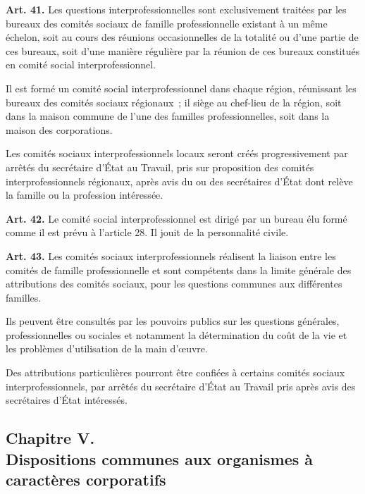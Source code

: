 \documentclass[french,twoside]{book} %
\newcommand{\labelchar}[1]{\textbf{\color{rubric} #1}}
\begin{document}
\noindent \labelchar{Art. 41.} Les questions interprofessionnelles sont exclusivement traitées par les bureaux des comités sociaux de famille professionnelle existant à un même échelon, soit au cours des réunions occasionnelles de la totalité ou d’une partie de ces bureaux, soit d’une manière régulière par la réunion de ces bureaux constitués en comité social interprofessionnel.\par
Il est formé un comité social interprofessionnel dans chaque région, réunissant les bureaux des comités sociaux régionaux ; il siège au chef-lieu de la région, soit dans la maison commune de l’une des familles professionnelles, soit dans la maison des corporations.\par
Les comités sociaux interprofessionnels locaux seront créés progressivement par arrêtés du secrétaire d’État au Travail, pris sur proposition des comités interprofessionnels régionaux, après avis du ou des secrétaires d’État dont relève la famille ou la profession intéressée.\par
\bigbreak
\noindent \labelchar{Art. 42.} Le comité social interprofessionnel est dirigé par un bureau élu formé comme il est prévu à l’article 28. Il jouit de la personnalité civile.\par
\bigbreak
\noindent \labelchar{Art. 43.} Les comités sociaux interprofessionnels réalisent la liaison entre les comités de famille professionnelle et sont compétents dans la limite générale des attributions des comités sociaux, pour les questions communes aux différentes familles.\par
Ils peuvent être consultés par les pouvoirs publics sur les questions générales, professionnelles ou sociales et notamment la détermination du coût de la vie et les problèmes d’utilisation de la main d’œuvre.\par
Des attributions particulières pourront être confiées à certains comités sociaux interprofessionnels, par arrêtés du secrétaire d’État au Travail pris après avis des secrétaires d’État intéressés.

\subsection[{Chapitre V. Dispositions communes aux organismes à caractères corporatifs}]{Chapitre V. \\
Dispositions communes aux organismes à caractères corporatifs}
\end{document}
